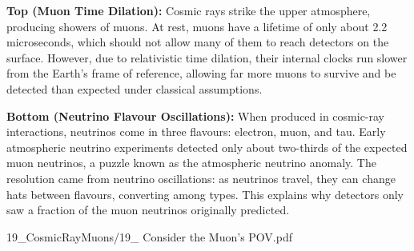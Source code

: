 \begin{SideNotePage}{

    \textbf{Top (Muon Time Dilation):} Cosmic rays strike the upper atmosphere, producing showers of muons. At rest, muons have a lifetime of only about 2.2 microseconds, which should not allow many of them to reach detectors on the surface. However, due to relativistic time dilation, their internal clocks run slower from the Earth’s frame of reference, allowing far more muons to survive and be detected than expected under classical assumptions. \par
    \textbf{Bottom (Neutrino Flavour Oscillations):} When produced in cosmic-ray interactions, neutrinos come in three flavours: electron, muon, and tau. Early atmospheric neutrino experiments detected only about two-thirds of the expected muon neutrinos, a puzzle known as the atmospheric neutrino anomaly. The resolution came from neutrino oscillations: as neutrinos travel, they can change \QSOpen{}hats\QSClose{} between flavours, converting among types. This explains why detectors only saw a fraction of the muon neutrinos originally predicted. \par

}{19_CosmicRayMuons/19_ Consider the Muon’s POV.pdf}
\end{SideNotePage}
